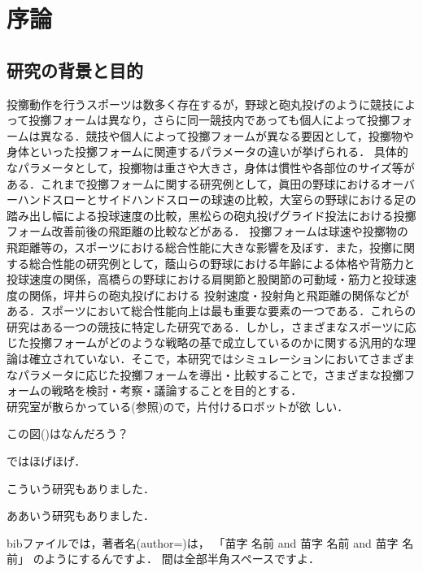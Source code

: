 \chapter[序論]%
        {序論}
        \section{研究の背景と目的}

        投擲動作を行うスポーツは数多く存在するが，野球と砲丸投げのように競技によって投擲フォームは異なり，さらに同一競技内であっても個人によって投擲フォームは異なる．競技や個人によって投擲フォームが異なる要因として，投擲物や身体といった投擲フォームに関連するパラメータの違いが挙げられる．
        具体的なパラメータとして，投擲物は重さや大きさ，身体は慣性や各部位のサイズ等がある．これまで投擲フォームに関する研究例として，眞田の野球におけるオーバーハンドスローとサイドハンドスローの球速の比較，大室らの野球における足の踏み出し幅による投球速度の比較，黒松らの砲丸投げグライド投法における投擲フォーム改善前後の飛距離の比較などがある．
        投擲フォームは球速や投擲物の飛距離等の，スポーツにおける総合性能に大きな影響を及ぼす．また，投擲に関する総合性能の研究例として，蔭山らの野球における年齢による体格や背筋力と投球速度の関係，高橋らの野球における肩関節と股関節の可動域・筋力と投球速度の関係，坪井らの砲丸投げにおける
        投射速度・投射角と飛距離の関係などがある．スポーツにおいて総合性能向上は最も重要な要素の一つである．これらの研究はある一つの競技に特定した研究である．しかし，さまざまなスポーツに応じた投擲フォームがどのような戦略の基で成立しているのかに関する汎用的な理論は確立されていない．そこで，本研究ではシミュレーションにおいてさまざまなパラメータに応じた投擲フォームを導出・比較することで，さまざまな投擲フォームの戦略を検討・考察・議論することを目的とする．\\
        研究室が散らかっている(参照)ので，片付けるロボットが欲
        しい．

        この図()はなんだろう？

        ではほげほげ．

        こういう研究\cite{Ikuo:doctor}もありました．

        ああいう研究\cite{Hondo:JRSJ2011}もありました．

        bibファイルでは，著者名(author=)は，
        「苗字 名前 and 苗字 名前 and 苗字 名前」
        のようにするんですよ\cite{Mizuuchi:RSJ2015-baneoid}．
        間は全部半角スペースですよ．

